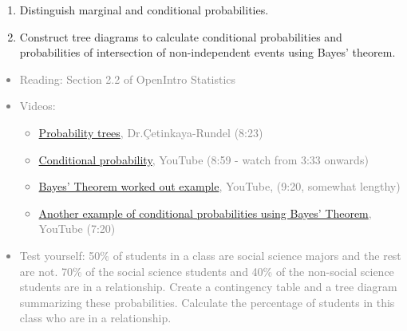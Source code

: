 \documentclass[11pt]{article}
\newcommand{\gray}[1]{\textcolor{gray}{#1}}
\begin{document}
%

\vspace{0.25cm}

%

\begin{enumerate}[resume]
\renewcommand\labelenumi{\textcolor{light}{\textbf{LO \theenumi.}}}

\item Distinguish marginal and conditional probabilities.

\item Construct tree diagrams to calculate conditional probabilities and probabilities of intersection of non-independent events using Bayes' theorem.

\end{enumerate}

\gray{
{\it
\vspace{-0.75cm}
\begin{itemize}
\renewcommand{\labelitemi}{{\textcolor{dark}{$\ast$}}}
\item Reading: Section 2.2 of OpenIntro Statistics
\item Videos:
\begin{itemize}
\item \href{http://www.youtube.com/watch?v=HxEz4ZHUY5Y}{Probability trees}, Dr.\c{C}etinkaya-Rundel (8:23)
\item \href{http://www.youtube.com/watch?feature=endscreen&NR=1&v=cwADSMeiIoE}{Conditional probability}, YouTube (8:59 - watch from 3:33 onwards)
\item \href{http://www.youtube.com/watch?v=2Df1sDAyRvQ}{Bayes' Theorem worked out example}, YouTube, (9:20, somewhat lengthy) 
\item \href{http://www.youtube.com/watch?v=E2pOJwSwWDk}{Another example of conditional probabilities using Bayes' Theorem}, YouTube (7:20)
\end{itemize}
\item Test yourself: 50\% of students in a class are social science majors and the rest are not. 70\% of the social science students and 40\% of the non-social science students are in a relationship. Create a contingency table and a tree diagram summarizing these probabilities. Calculate the percentage of students in this class who are in a relationship.
\end{itemize}
}}
\end{document}

